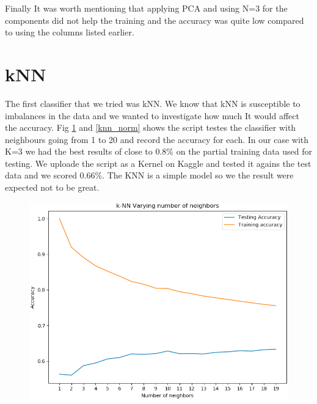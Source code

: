 \documentclass[a4paper, 11pt]{article}
\begin{document}
Finally It was worth mentioning that applying PCA and using N=3 for the components did not help the training and the accuracy was quite low compared to using the columns listed earlier.

\section*{kNN}
The first classifier that we tried was kNN. We know that kNN is susceptible to imbalances in the data and we wanted to investigate how much It would affect the accuracy. Fig \ref{knn_no_norm} and \ref{knn_norm} shows the  script testes the classifier with neighbours going from 1 to 20 and record the accuracy for each. In our case with K=3 we had the best results of close to 0.8\% on the partial training data used for testing. We uploade the script as a Kernel on Kaggle and tested it agains the test data and we scored 0.66\%. The KNN is a simple model so we the result were expected not to be great.

\begin{figure}[htb]
\centering
  \includegraphics[width=1\textwidth]{img/knn_no_norm}
  \label{knn_no_norm}
\end{figure}
\end{document}
